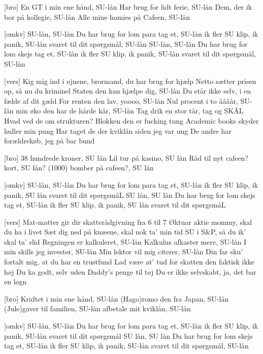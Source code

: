 \documentclass[a4paper,11pt]{article}
\begin{document}
\begin{song}
  [bro] En GT i min ene hånd, SU-lån
  Har brug for lidt ferie, SU-lån
  Dem, der ik bor på kollegie, SU-lån
  Alle mine homies på Cafeen, SU-lån

  [omkv] SU-lån, SU-lån
  Du har brug for lom para tag et, SU-lån
  ik fler SU klip, ik panik, SU-lån
  svaret til dit spørgsmål, SU-lån
  SU-lån, SU-lån
  Du har brug for lom skejs tag et, SU-lån
  ik fler SU klip, ik panik, SU-lån
  svaret til dit spørgsmål, SU-lån

  [vers] Kig mig ind i øjnene, brormand, du har brug for hjælp
  Netto sætter prisen op, så nu du kriminel
  Staten den kan hjælpe dig, SU-lån
  Du står ikke selv, i en fælde af dit gæld
  For renten den lav, yoooo, SU-lån
  Nul procent i to åååår, SU-lån
  min øko den har de hårde kår, SU-lån
  Tag drik en stor tår, tag og SKÅL
  Hvad ved de om strukturen? Blokken den er fucking tung
  Academic books skyder huller min pung
  Har taget de der kviklån siden jeg var ung
  De andre har forældrekøb, jeg på bar bund

  [bro] 38 hundrede kroner, SU lån
  Lil tur på kasino, SU lån
  Råd til nyt cafeen? kort, SU lån?
  (1000) bomber på cafeen?, SU lån

  [omkv] SU-lån, SU-lån
  Du har brug for lom para tag et, SU-lån
  ik fler SU klip, ik panik, SU lån
  svaret til dit spørgsmåL
  SU lån, SU lån
  Du har brug for lom skejs tag et, SU-lån
  ik fler SU klip, ik panik, SU lån
  svaret til dit spørgsmåL

  [vers] Mat-matter gir dir skatterådgivning fra 6 til 7
  Øktuar aktie mommy, skal du ha i livet
  Sæt dig ned på knæene, skal nok ta' min tid
  SU i S\&P, så du ik' skal ta' slid
  Regningen er kalkuleret, SU-lån
  Kalkulus afkaster mere, SU-lån
  I min skills jeg invester, SU-lån
  Min lektor vil mig citerer, SU-lån
  Din far sku' fortalt mig, at du har en trustfund
  Lad være at' tud for skatten den faktisk ikke høj
  Du ka godt, selv uden Daddy's penge til tøj
  Du er ikke selvskabt, ja, det bar en løgn

  [bro] Kridtet i min ene hånd, SU-lån
  (Hago)romo den fra Japan, SU-lån
  (Jule)gaver til familien, SU-lån
   afbetale mit kviklån, SU-lån

  [omkv] SU-lån, SU-lån
  Du har brug for lom para tag et, SU-lån
  ik fler SU klip, ik panik, SU-lån
  svaret til dit spørgsmål
  SU lån, SU lån
  Du har brug for lom skejs tag et, SU-lån
  ik fler SU klip, ik panik, SU-lån
  svaret til dit spørgsmål, SU-lån
\end{song}
\end{document}
